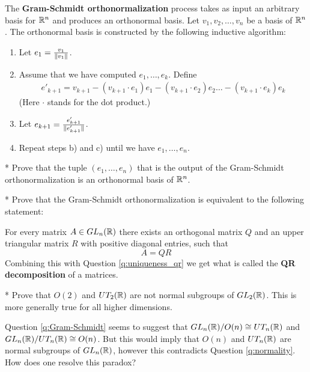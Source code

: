 \newpage
\begin{definition}
	The \textbf{Gram-Schmidt orthonormalization} process takes as input an arbitrary basis for $\mathbb{R}^n$ and produces an orthonormal basis. Let $v_1, v_2, \dots, v_n$ be a basis of $\mathbb{R}^n$. The orthonormal basis is constructed by the following inductive algorithm:
	\begin{mdframed}
		\begin{enumerate}
			\item Let $e_1 = \frac{v_1}{\lVert v_1 \rVert}$.
			\item Assume that we have computed $e_1, \dots, e_k$. Define
			\begin{align*}
				e'_{k+1} = v_{k+1} - (v_{k+1} \cdot e_1)e_1 - (v_{k+1}\cdot e_2)e_2 \dots - (v_{k+1} \cdot e_k)e_k
			\end{align*}
			(Here $\cdot$ stands for the dot product.)
			\item Let $e_{k+1} = \frac{e'_{k+1}}{\lVert e'_{k+1} \rVert}$.
			\item Repeat steps b) and c) until we have $e_1, \dots, e_n$.
		\end{enumerate}
	\end{mdframed}
\end{definition}


	\begin{question}*
	  Prove that the tuple $(e_1, \dots, e_n)$ that is the output of the Gram-Schmidt orthonormalization is an orthonormal basis of $\mathbb{R}^n$.
	\end{question}

	\begin{question}*
	  \label{q:Gram-Schmidt}
	  Prove that the Gram-Schmidt orthonormalization is equivalent to the following statement:

	  For every matrix $A \in GL_n(\mathbb{R})$ there exists an orthogonal matrix $Q$ and an upper triangular matrix $R$ with positive diagonal entries, such that $$A = QR$$
		Combining this with Question \ref{q:uniqueness_qr} we get what is called the \textbf{QR decomposition} of a matrices.
	\end{question}

\begin{question}*
    \label{q:normality}
  Prove that $O(2)$ and $UT_2(\mathbb{R})$ are not normal subgroups of $GL_2(\mathbb{R})$. This is more generally true for all higher dimensions.
\end{question}

\begin{question}
  Question \ref{q:Gram-Schmidt} seems to suggest that $GL_n(\mathbb{R})/O(n) \cong UT_n(\mathbb{R})$ and $GL_n(\mathbb{R})/UT_n(\mathbb{R}) \cong O(n)$. But this would imply that $O(n)$ and $UT_n(\mathbb{R})$ are normal subgroups of $GL_n(\mathbb{R})$, however this contradicts Question \ref{q:normality}. How does one resolve this paradox?
\end{question}



